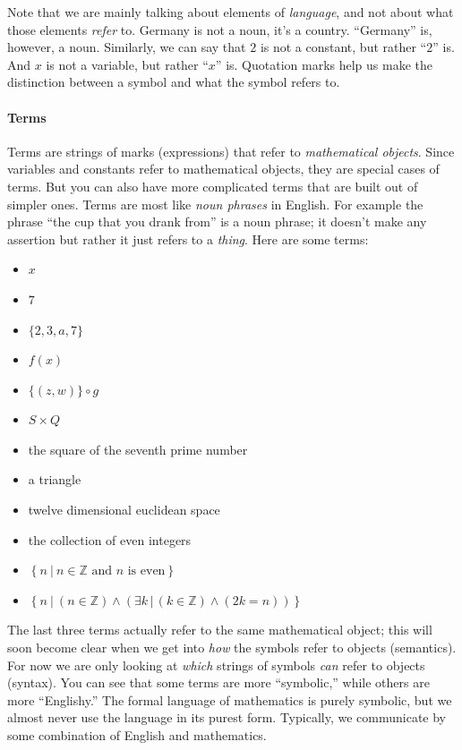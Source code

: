 \documentclass[12pt]{article}
\def\Z{\mathbb{Z}}
\newcommand{\settext}[2]{\left\{ #1\ |\ \text{#2} \right\}}
\newcommand{\AND}{\wedge}
\begin{document}
Note that we are mainly talking about elements of \emph{language}, and not about what those elements \emph{refer} to.
Germany is not a noun, it's a country. ``Germany'' is, however, a noun.
Similarly, we can say that $2$ is not a constant, but rather ``$2$'' is.
And $x$ is not a variable, but rather ``$x$'' is.
Quotation marks help us make the distinction between a symbol and what the symbol refers to.




\def\sp{\hspace{1em}}
\paragraph{Terms}
Terms are strings of marks (expressions) that refer to \emph{mathematical objects}.
Since variables and constants refer to mathematical objects, they are special cases of terms.
But you can also have more complicated terms that are built out of simpler ones.
Terms are most like \emph{noun phrases} in English.
For example the phrase ``the cup that you drank from'' is a noun phrase;
it doesn't make any assertion but rather it just refers to a \emph{thing}.
Here are some terms:
\begin{itemize}[label=\sp]
\item $x$
\item $7$
\item $\{2,3,a,7\}$
\item $f(x)$
\item $\{(z,w)\} \circ g$
\item $S\times Q$
\item the square of the seventh prime number
\item a triangle
\item twelve dimensional euclidean space
\item the collection of even integers
\item $\settext{n}{$n\in\Z$ and $n$ is even}$
\item $\settext{n}{$(n\in\Z)\AND (\exists k\,|\,(k\in\Z)\AND(2k=n))$}$
\end{itemize}
The last three terms actually refer to the same mathematical object; this will soon become clear
when we get into \emph{how} the symbols refer to objects (semantics). For now we are only looking at
\emph{which} strings of symbols \emph{can} refer to objects (syntax).
You can see that some terms are more ``symbolic,'' while others are more ``Englishy.''
The formal language of mathematics is purely symbolic,
but we almost never use the language in its purest form.
Typically, we communicate by some combination of English and mathematics.
\end{document}
